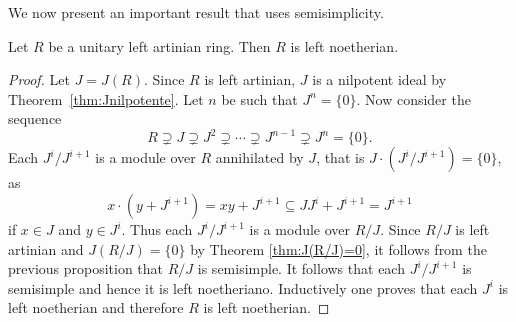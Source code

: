


We now present an important result that uses 
semisimplicity. 

\begin{theorem}
	\label{thm:Hopkins-Levitski}
	Let $R$ be a unitary left artinian ring. Then $R$ is left noetherian.
\end{theorem}

\begin{proof}
	Let $J=J(R)$. Since $R$ is left artinian, $J$ is a nilpotent ideal 
	by Theorem~\ref{thm:Jnilpotente}. Let $n$ be such that $J^n=\{0\}$. Now consider the sequence 
	\[
		R\supsetneq J\supsetneq J^2\supsetneq\cdots\supsetneq J^{n-1}\supsetneq J^n=\{0\}.
	\]
	Each $J^{i}/J^{i+1}$ is a module over $R$ annihilated by $J$, 
	that is $J\cdot (J^i/J^{i+1})=\{0\}$, as 
	\[
	x\cdot (y+J^{i+1})=xy+J^{i+1}\subseteq JJ^i+J^{i+1}=J^{i+1} 
	\]
	if $x\in J$ and $y\in J^i$. 
	Thus each  
	$J^i/J^{i+1}$ is a module over $R/J$. Since $R/J$ is left artinian and 
	$J(R/J)=\{0\}$ by Theorem \ref{thm:J(R/J)=0}, it follows from the previous proposition that $R/J$ is semisimple. 
	It follows that each $J^{i}/J^{i+1}$ 
	is semisimple and hence it is left noetheriano. Inductively one proves that each 
	$J^i$ is left noetherian and therefore $R$ is left noetherian. 
\end{proof}


